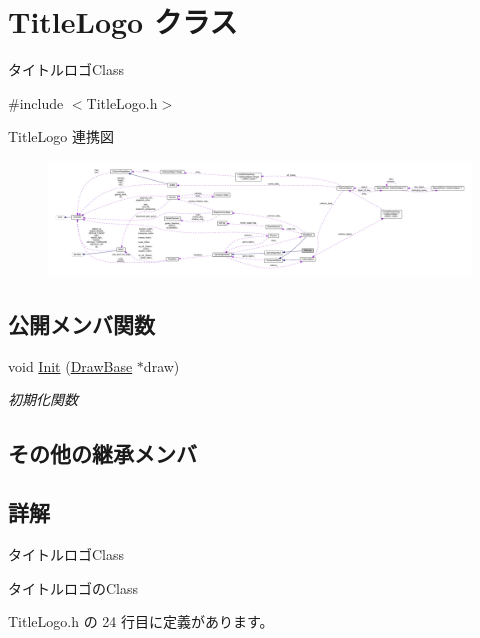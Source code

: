 \hypertarget{class_title_logo}{}\section{Title\+Logo クラス}
\label{class_title_logo}


タイトルロゴ\+Class  




{\ttfamily \#include $<$Title\+Logo.\+h$>$}



Title\+Logo 連携図\nopagebreak
\begin{figure}[H]
\begin{center}
\leavevmode
\includegraphics[width=350pt]{class_title_logo__coll__graph}
\end{center}
\end{figure}
\subsection*{公開メンバ関数}
\begin{DoxyCompactItemize}
\item 
void \mbox{\hyperlink{class_title_logo_a1e07aae4771bd7a44cb7e3b55b72b9f3}{Init}} (\mbox{\hyperlink{class_draw_base}{Draw\+Base}} $\ast$draw)
\begin{DoxyCompactList}\small\item\em 初期化関数 \end{DoxyCompactList}\end{DoxyCompactItemize}
\subsection*{その他の継承メンバ}


\subsection{詳解}
タイトルロゴ\+Class 

タイトルロゴの\+Class 

 Title\+Logo.\+h の 24 行目に定義があります。



